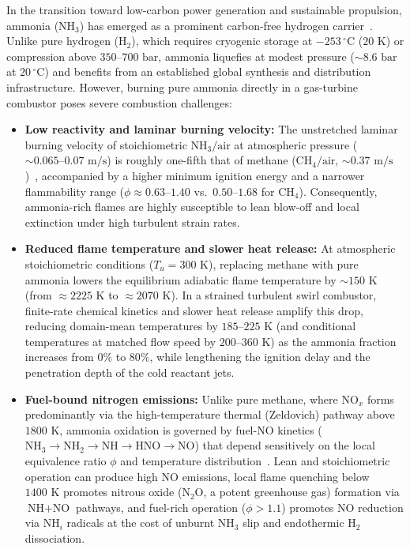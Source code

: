 In the transition toward low-carbon power generation and sustainable propulsion, ammonia ($\text{NH}_3$) has emerged as a prominent carbon-free hydrogen carrier~\cite{valera2018ammonia, kobayashi2019science}. Unlike pure hydrogen ($\text{H}_2$), which requires cryogenic storage at $-253\,^\circ\text{C}$ ($20\text{ K}$) or compression above $350\text{--}700\text{ bar}$, ammonia liquefies at modest pressure ($\sim 8.6\text{ bar}$ at $20\,^\circ\text{C}$) and benefits from an established global synthesis and distribution infrastructure. However, burning pure ammonia directly in a gas-turbine combustor poses severe combustion challenges:
\begin{itemize}
    \item \textbf{Low reactivity and laminar burning velocity:} The unstretched laminar burning velocity of stoichiometric $\text{NH}_3/\text{air}$ at atmospheric pressure ($\sim 0.065\text{--}0.07\text{ m/s}$) is roughly one-fifth that of methane ($\text{CH}_4/\text{air}$, $\sim 0.37\text{ m/s}$)~\cite{hayakawa2015laminar, okafor2018experimental}, accompanied by a higher minimum ignition energy and a narrower flammability range ($\phi \approx 0.63\text{--}1.40$ vs.\ $0.50\text{--}1.68$ for $\text{CH}_4$). Consequently, ammonia-rich flames are highly susceptible to lean blow-off and local extinction under high turbulent strain rates.
    \item \textbf{Reduced flame temperature and slower heat release:} At atmospheric stoichiometric conditions ($T_u = 300\text{ K}$), replacing methane with pure ammonia lowers the equilibrium adiabatic flame temperature by $\sim 150\text{ K}$ (from $\approx 2225\text{ K}$ to $\approx 2070\text{ K}$). In a strained turbulent swirl combustor, finite-rate chemical kinetics and slower heat release amplify this drop, reducing domain-mean temperatures by $185\text{--}225\text{ K}$ (and conditional temperatures at matched flow speed by $200\text{--}360\text{ K}$) as the ammonia fraction increases from $0\%$ to $80\%$, while lengthening the ignition delay and the penetration depth of the cold reactant jets.
    \item \textbf{Fuel-bound nitrogen emissions:} Unlike pure methane, where $\text{NO}_x$ forms predominantly via the high-temperature thermal (Zeldovich) pathway above $1800\text{ K}$, ammonia oxidation is governed by fuel-$\text{NO}$ kinetics ($\text{NH}_3 \rightarrow \text{NH}_2 \rightarrow \text{NH} \rightarrow \text{HNO} \rightarrow \text{NO}$) that depend sensitively on the local equivalence ratio $\phi$ and temperature distribution~\cite{kobayashi2019science}. Lean and stoichiometric operation can produce high $\text{NO}$ emissions, local flame quenching below $1400\text{ K}$ promotes nitrous oxide ($\text{N}_2\text{O}$, a potent greenhouse gas) formation via $\text{NH} + \text{NO}$ pathways, and fuel-rich operation ($\phi > 1.1$) promotes $\text{NO}$ reduction via $\text{NH}_i$ radicals at the cost of unburnt $\text{NH}_3$ slip and endothermic $\text{H}_2$ dissociation.
\end{itemize}

